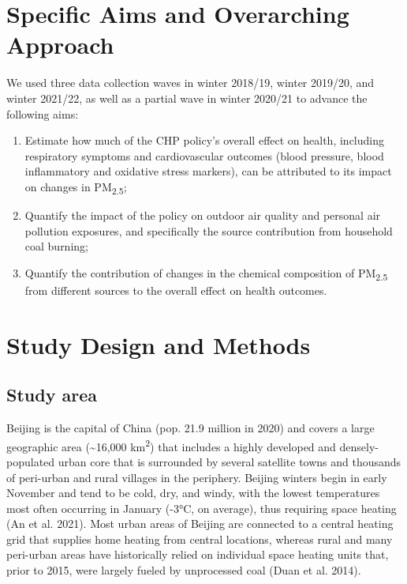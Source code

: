 \documentclass[
  letterpaper,
  DIV=11,
  numbers=noendperiod]{scrartcl}
\begin{document}
\section{Specific Aims and Overarching
Approach}\label{specific-aims-and-overarching-approach}

We used three data collection waves in winter 2018/19, winter 2019/20,
and winter 2021/22, as well as a partial wave in winter 2020/21 to
advance the following aims:

\begin{enumerate}
\def\labelenumi{\arabic{enumi}.}
\item
  Estimate how much of the CHP policy's overall effect on health,
  including respiratory symptoms and cardiovascular outcomes (blood
  pressure, blood inflammatory and oxidative stress markers), can be
  attributed to its impact on changes in PM\textsubscript{2.5};
\item
  Quantify the impact of the policy on outdoor air quality and personal
  air pollution exposures, and specifically the source contribution from
  household coal burning;
\item
  Quantify the contribution of changes in the chemical composition of
  PM\textsubscript{2.5} from different sources to the overall effect on
  health outcomes.
\end{enumerate}

\section{Study Design and Methods}\label{study-design-and-methods}

\subsection{Study area}\label{study-area}

Beijing is the capital of China (pop. 21.9 million in 2020) and covers a
large geographic area (\textasciitilde16,000 km\textsuperscript{2}) that
includes a highly developed and densely-populated urban core that is
surrounded by several satellite towns and thousands of peri-urban and
rural villages in the periphery. Beijing winters begin in early November
and tend to be cold, dry, and windy, with the lowest temperatures most
often occurring in January (-3°C, on average), thus requiring space
heating (An et al. 2021). Most urban areas of Beijing are connected to a
central heating grid that supplies home heating from central locations,
whereas rural and many peri-urban areas have historically relied on
individual space heating units that, prior to 2015, were largely fueled
by unprocessed coal (Duan et al. 2014).
\end{document}
